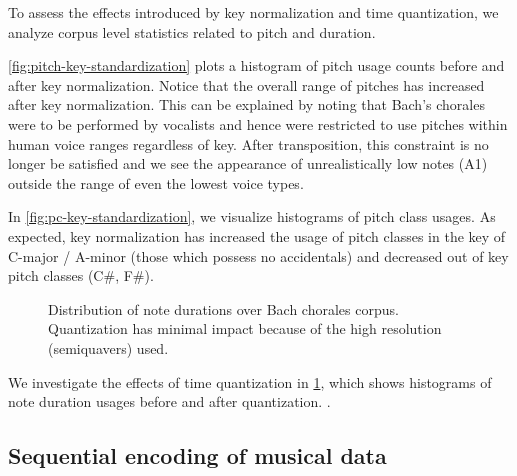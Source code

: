 To assess the effects introduced by key normalization and time quantization,
we analyze corpus level statistics related to pitch and duration.


\cref{fig:pitch-key-standardization} plots a histogram of pitch usage counts
before and after key normalization. Notice that the overall range of pitches
has increased after key normalization. This can be explained by noting that
Bach's chorales were to be performed by vocalists and hence were restricted to
use pitches within human voice ranges regardless of key. After transposition,
this constraint is no longer be satisfied and we see the appearance of
unrealistically low notes (\eg A1) outside the range of even the lowest voice
types.

In \cref{fig:pc-key-standardization}, we visualize histograms of pitch class usages.
As expected, key normalization has increased the usage of pitch classes in the key of
C-major / A-minor (\ie those which possess no accidentals) and decreased out of key
pitch classes (\eg C\#, F\#).

\begin{figure}[tb]
    \centering
    \begin{subfigure}[t]{0.48\textwidth}
        \centering
        
    \end{subfigure}
    \begin{subfigure}[t]{0.48\textwidth}
        \centering
        
    \end{subfigure}
    \caption{Distribution of note durations over Bach chorales corpus. Quantization has minimal impact
    because of the high resolution (semiquavers) used.}
    \label{fig:note-lengths-time-quantization}
\end{figure}

We investigate the effects of time quantization in
\cref{fig:note-lengths-time-quantization}, which shows histograms of note
duration usages before and after quantization. .


\subsection{Sequential encoding of musical data}
\label{sec:sequential-encoding}

